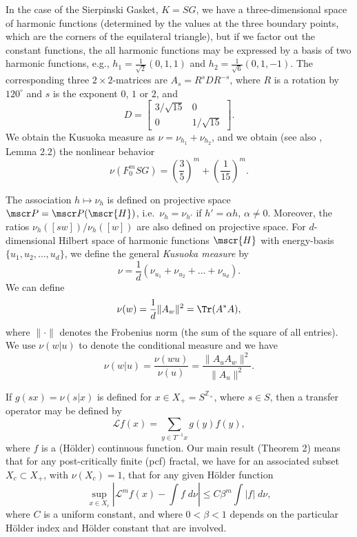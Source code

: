 \documentclass[11pt]{scrartcl}
\renewcommand{\H}{\mscr{H}}
\theoremstyle{plain} %
\theoremstyle{definition}
\begin{document}
In the case of the Sierpinski Gasket, $K=SG$,
we have a three-dimensional space of harmonic functions (determined by the values at the three boundary points,
which are the corners of the equilateral triangle), 
but if we factor out the constant functions, the all harmonic functions may be expressed by a basis 
of two harmonic functions, e.g., $h_1=\frac{1}{\sqrt{2}}(0,1,1)$ and $h_2=\frac{1}{\sqrt{6}}(0,1,-1)$. The corresponding three
$2\times 2$-matrices are $A_s=R^s D R^{-s}$, where $R$ is a rotation by $120^{\circ}$ and $s$ is the exponent $0$, $1$ or $2$, and
$$ D = \begin{bmatrix} 3/\sqrt{15} & 0 \\ 0 & 1/\sqrt{15} \end{bmatrix}.$$
We obtain the Kusuoka measure as $\nu=\nu_{h_1}+\nu_{h_2}$, and we obtain (see also \cite{str2}, Lemma 2.2) the nonlinear behavior
$$\nu(F_0^m SG)=\left(\frac{3}{5}\right)^m+\left(\frac{1}{15}\right)^m.$$
 
The association $h\mapsto \nu_{h}$ is defined on projective space
$\mscr P = \mscr P(\H)$, i.e.\ $\nu_h=\nu_{h'}$ if $h'=\alpha h$,
$\alpha\not=0$. Moreover, the ratios $\nu_h([sw])/\nu_h([w])$ are also
defined on projective space. For $d$-dimensional Hilbert space of harmonic functions $\H$ with
energy-basis $\{u_1,u_2,\dots,u_d\}$, we define the general
\emph{Kusuoka measure} by
$$\nu = \frac 1d \left(\nu_{u_1} + \nu_{u_2} + \dots + \nu_{u_d}\right).$$
We can define  
\begin{equation}\label{kusuokadef}
\nu(w) = \frac{1}{d}\|A_w\|^2 =\Tr( A^* A ),
\end{equation}
where $\|\cdot \|$ denotes the Frobenius norm (the sum of the square of all entries).
We use $\nu(w|u)$ to denote the conditional measure and we have 
$$ \nu(w|u)=\frac{\nu(wu)}{\nu(u)} = \frac{\|A_u A_w\|^2}{\| A_u \|^2}. $$

If $g(sx)=\nu (s|x)$ is defined for $x\in X_+ =S^{{\mathbb Z}_+}$, where $s\in S$, then a transfer operator may be defined by
$${\mathcal L} f(x)=\sum_{y\in T^{-1}x} g(y)f(y),$$
where $f$ is a (H\"older) continuous function. Our main result (Theorem 2) means that for any post-critically finite (pcf) fractal, we have for an associated subset $X_c \subset X_+$, with $\nu(X_c)=1$, that for any given H\"older function
$$\sup_{x\in X_c} |{\mathcal L}^m f(x)-\int f\; d\nu|\leq C\beta^m\int |f|\; d\nu,$$
where $C$ is a uniform constant, and where $0<\beta<1$ depends on the particular H\"older index and H\"older constant that are involved.
\end{document}

